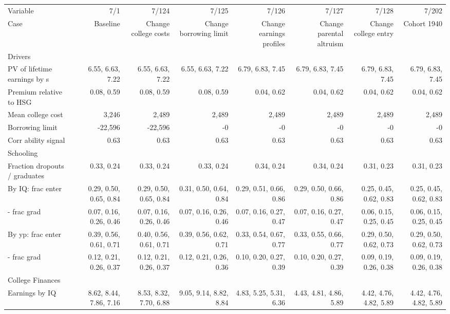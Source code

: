 \begin{tabular}{lrrrrrrr}
\hline
Variable & 7/1  & 7/124  & 7/125  & 7/126  & 7/127  & 7/128  & 7/202  \\ 
Case & Baseline  & Change college costs  & Change borrowing limit  & Change earnings profiles  & Change parental altruism  & Change college entry  & Cohort 1940  \\ 
Drivers &   &   &   &   &   &   &   \\ 
PV of lifetime earnings by s & 6.55, 6.63, 7.22  & 6.55, 6.63, 7.22  & 6.55, 6.63, 7.22  & 6.79, 6.83, 7.45  & 6.79, 6.83, 7.45  & 6.79, 6.83, 7.45  & 6.79, 6.83, 7.45  \\ 
Premium relative to HSG & 0.08, 0.59  & 0.08, 0.59  & 0.08, 0.59  & 0.04, 0.62  & 0.04, 0.62  & 0.04, 0.62  & 0.04, 0.62  \\ 
Mean college cost & 3,246  & 2,489  & 2,489  & 2,489  & 2,489  & 2,489  & 2,489  \\ 
Borrowing limit & -22,596  & -22,596  & -0  & -0  & -0  & -0  & -0  \\ 
Corr ability signal & 0.63  & 0.63  & 0.63  & 0.63  & 0.63  & 0.63  & 0.63  \\ 
\hline
Schooling &   &   &   &   &   &   &   \\ 
Fraction dropouts / graduates & 0.33, 0.24  & 0.33, 0.24  & 0.33, 0.24  & 0.34, 0.24  & 0.34, 0.24  & 0.31, 0.23  & 0.31, 0.23  \\ 
By IQ: frac enter & 0.29, 0.50, 0.65, 0.84  & 0.29, 0.50, 0.65, 0.84  & 0.31, 0.50, 0.64, 0.84  & 0.29, 0.51, 0.66, 0.86  & 0.29, 0.50, 0.66, 0.86  & 0.25, 0.45, 0.62, 0.83  & 0.25, 0.45, 0.62, 0.83  \\ 
- frac grad & 0.07, 0.16, 0.26, 0.46  & 0.07, 0.16, 0.26, 0.46  & 0.07, 0.16, 0.26, 0.46  & 0.07, 0.16, 0.27, 0.47  & 0.07, 0.16, 0.27, 0.47  & 0.06, 0.15, 0.25, 0.45  & 0.06, 0.15, 0.25, 0.45  \\ 
By yp: frac enter & 0.39, 0.56, 0.61, 0.71  & 0.40, 0.56, 0.61, 0.71  & 0.39, 0.56, 0.62, 0.71  & 0.33, 0.54, 0.67, 0.77  & 0.33, 0.55, 0.66, 0.77  & 0.29, 0.50, 0.62, 0.73  & 0.29, 0.50, 0.62, 0.73  \\ 
- frac grad & 0.12, 0.21, 0.26, 0.37  & 0.12, 0.21, 0.26, 0.37  & 0.12, 0.21, 0.26, 0.36  & 0.10, 0.20, 0.27, 0.39  & 0.10, 0.20, 0.27, 0.39  & 0.09, 0.19, 0.26, 0.38  & 0.09, 0.19, 0.26, 0.38  \\ 
\hline
College Finances &   &   &   &   &   &   &   \\ 
Earnings by IQ & 8.62, 8.44, 7.86, 7.16  & 8.53, 8.32, 7.70, 6.88  & 9.05, 9.14, 8.82, 8.84  & 4.83, 5.25, 5.31, 6.36  & 4.43, 4.81, 4.86, 5.89  & 4.42, 4.76, 4.82, 5.89  & 4.42, 4.76, 4.82, 5.89  \\ 

\end{tabular}
